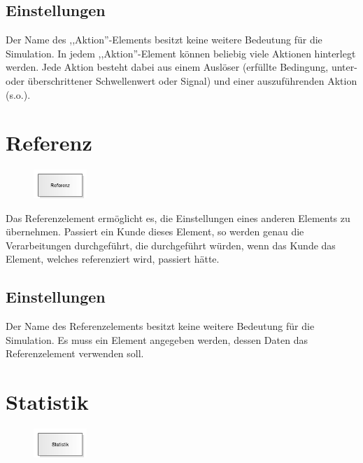 \subsection*{Einstellungen}

Der Name des ,,Aktion''-Elements besitzt keine weitere Bedeutung für die Simulation.
In jedem ,,Aktion''-Element können beliebig viele Aktionen hinterlegt werden. Jede
Aktion besteht dabei aus einem Auslöser (erfüllte Bedingung, unter- oder überschrittener
Schwellenwert oder Signal) und einer auszuführenden Aktion (s.o.).


\section{Referenz}
\label{ref:ModelElementReference}

\begin{figure}
\vspace{-22pt}
\includegraphics[width=2cm]{imageModelElementReference.png}
\vspace{-22pt}
\end{figure}

Das Referenzelement ermöglicht es, die Einstellungen eines anderen Elements zu übernehmen.
Passiert ein Kunde dieses Element, so werden genau die Verarbeitungen durchgeführt, die
durchgeführt würden, wenn das Kunde das Element, welches referenziert wird, passiert hätte.

\subsection*{Einstellungen}

Der Name des Referenzelements besitzt keine weitere Bedeutung für die Simulation.
Es muss ein Element angegeben werden, dessen Daten das Referenzelement verwenden soll.


\section{Statistik}
\label{ref:ModelElementUserStatistic}

\begin{figure}
\vspace{-22pt}
\includegraphics[width=2cm]{imageModelElementUserStatistic.png}
\vspace{-22pt}
\end{figure}

